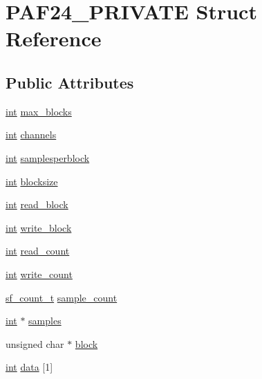 \hypertarget{struct_p_a_f24___p_r_i_v_a_t_e}{}\section{P\+A\+F24\+\_\+\+P\+R\+I\+V\+A\+TE Struct Reference}
\label{struct_p_a_f24___p_r_i_v_a_t_e}
\subsection*{Public Attributes}
\begin{DoxyCompactItemize}
\item 
\hyperlink{xmltok_8h_a5a0d4a5641ce434f1d23533f2b2e6653}{int} \hyperlink{struct_p_a_f24___p_r_i_v_a_t_e_a7f6fc6471e6cdf44963a853e599e62f6}{max\+\_\+blocks}
\item 
\hyperlink{xmltok_8h_a5a0d4a5641ce434f1d23533f2b2e6653}{int} \hyperlink{struct_p_a_f24___p_r_i_v_a_t_e_a3aedd34e64c15fbd52f9bf360a2a969d}{channels}
\item 
\hyperlink{xmltok_8h_a5a0d4a5641ce434f1d23533f2b2e6653}{int} \hyperlink{struct_p_a_f24___p_r_i_v_a_t_e_ae812407cd14941121d7b0ca9a0169c18}{samplesperblock}
\item 
\hyperlink{xmltok_8h_a5a0d4a5641ce434f1d23533f2b2e6653}{int} \hyperlink{struct_p_a_f24___p_r_i_v_a_t_e_a3f43a8bd1e0a410e045659ebd91367d5}{blocksize}
\item 
\hyperlink{xmltok_8h_a5a0d4a5641ce434f1d23533f2b2e6653}{int} \hyperlink{struct_p_a_f24___p_r_i_v_a_t_e_aef48700baa1acc5d83cf8911122d5736}{read\+\_\+block}
\item 
\hyperlink{xmltok_8h_a5a0d4a5641ce434f1d23533f2b2e6653}{int} \hyperlink{struct_p_a_f24___p_r_i_v_a_t_e_a43ee03dbc915688f375f2a23243180fb}{write\+\_\+block}
\item 
\hyperlink{xmltok_8h_a5a0d4a5641ce434f1d23533f2b2e6653}{int} \hyperlink{struct_p_a_f24___p_r_i_v_a_t_e_a3603b50be597a04576753a7e32d2b089}{read\+\_\+count}
\item 
\hyperlink{xmltok_8h_a5a0d4a5641ce434f1d23533f2b2e6653}{int} \hyperlink{struct_p_a_f24___p_r_i_v_a_t_e_afda25e4990fbe3323e56427a20c0e933}{write\+\_\+count}
\item 
\hyperlink{mac_2config_2i386_2lib-src_2libsndfile_2src_2sndfile_8h_a398121a5f562230ea7f772528fff5f84}{sf\+\_\+count\+\_\+t} \hyperlink{struct_p_a_f24___p_r_i_v_a_t_e_a4484d4fd9f839e403545ce39575add2b}{sample\+\_\+count}
\item 
\hyperlink{xmltok_8h_a5a0d4a5641ce434f1d23533f2b2e6653}{int} $\ast$ \hyperlink{struct_p_a_f24___p_r_i_v_a_t_e_a31309938fe546c0f4995b80a85b51ce9}{samples}
\item 
unsigned char $\ast$ \hyperlink{struct_p_a_f24___p_r_i_v_a_t_e_a41731d53a005fef3b1b5e361df1c4d8f}{block}
\item 
\hyperlink{xmltok_8h_a5a0d4a5641ce434f1d23533f2b2e6653}{int} \hyperlink{struct_p_a_f24___p_r_i_v_a_t_e_a9a87e0cf7db5e0ebb523c5c7097a6240}{data} \mbox{[}1\mbox{]}
\end{DoxyCompactItemize}


